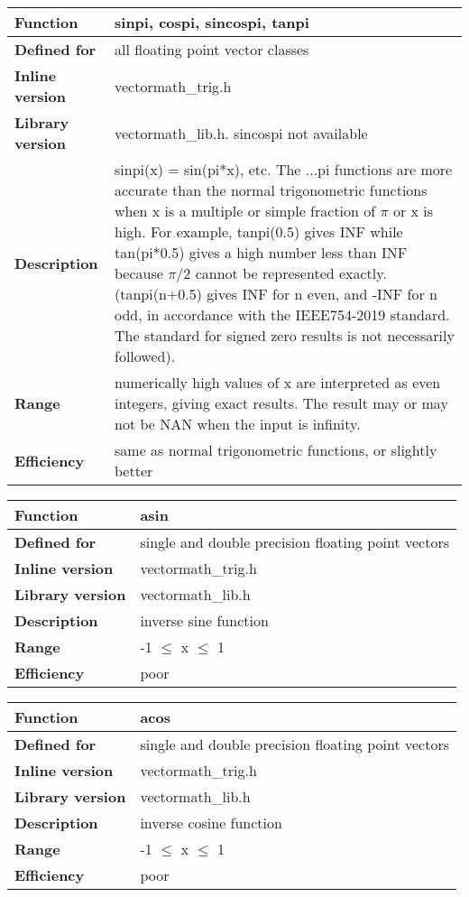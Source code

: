 \documentclass[vcl_manual.tex]{subfiles}
\begin{document}
\begin{tabular}{|p{30mm}|p{120mm}|}
\hline
\bfseries Function & sinpi, cospi, sincospi, tanpi \\ \hline
\bfseries Defined for & all floating point vector classes \\ \hline
\bfseries Inline version & vectormath\_trig.h \\ \hline
\bfseries Library version & vectormath\_lib.h. sincospi not available \\ \hline
\bfseries Description & sinpi(x) = sin(pi*x), etc. \newline
The ...pi functions are more accurate than the normal trigonometric functions when x is a multiple or simple fraction of $\pi$ or x is high. For example, tanpi(0.5) gives INF while tan(pi*0.5) gives a high number less than INF because $\pi/2$ cannot be represented exactly. (tanpi(n+0.5) gives INF for n even, and -INF for n odd, in accordance with the IEEE754-2019 standard. The standard for signed zero results is not necessarily followed). \\ \hline
\bfseries Range & numerically high values of x are interpreted as even integers, giving exact results. The result may or may not be NAN when the input is infinity. \\ \hline
\bfseries Efficiency & same as normal trigonometric functions, or slightly better \\ \hline
\end{tabular}


\begin{tabular}{|p{30mm}|p{120mm}|}
\hline
\bfseries Function & asin \\ \hline
\bfseries Defined for & single and double precision floating point vectors \\ \hline
\bfseries Inline version & vectormath\_trig.h \\ \hline
\bfseries Library version & vectormath\_lib.h \\ \hline
\bfseries Description & inverse sine function \\ \hline
\bfseries Range & -1 $\leq$ x $\leq$ 1 \\ \hline
\bfseries Efficiency & poor \\ \hline
\end{tabular}


\begin{tabular}{|p{30mm}|p{120mm}|}
\hline
\bfseries Function & acos \\ \hline
\bfseries Defined for & single and double precision floating point vectors \\ \hline
\bfseries Inline version & vectormath\_trig.h \\ \hline
\bfseries Library version & vectormath\_lib.h \\ \hline
\bfseries Description & inverse cosine function \\ \hline
\bfseries Range & -1 $\leq$ x $\leq$ 1 \\ \hline
\bfseries Efficiency & poor \\ \hline
\end{tabular}
\end{document}
